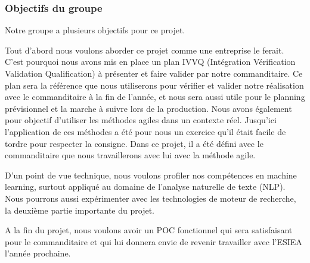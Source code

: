 \subsubsection{Objectifs du groupe}
Notre groupe a plusieurs objectifs pour ce projet.

Tout d'abord nous voulons aborder ce projet comme une entreprise le ferait.
C'est pourquoi nous avons mis en place un plan IVVQ (Intégration Vérification Validation Qualification) à présenter et faire valider par notre commanditaire.
Ce plan sera la référence que nous utiliserons pour vérifier et valider notre réalisation avec le commanditaire à la fin de l'année, et nous sera aussi utile pour le planning prévisionnel et la marche à suivre lors de la production.
Nous avons également pour objectif d'utiliser les méthodes agiles dans un contexte réel.
Jusqu'ici l'application de ces méthodes a été pour nous un exercice qu'il était facile de tordre pour respecter la consigne.
Dans ce projet, il a été défini avec le commanditaire que nous travaillerons avec lui avec la méthode agile.


D'un point de vue technique, nous voulons profiler nos compétences en machine learning, surtout appliqué au domaine de l'analyse naturelle de texte (NLP).
Nous pourrons aussi expérimenter avec les technologies de moteur de recherche, la deuxième partie importante du projet.


A la fin du projet, nous voulons avoir un POC fonctionnel qui sera satisfaisant pour le commanditaire et qui lui donnera envie de revenir travailler avec l'ESIEA l'année prochaine.





